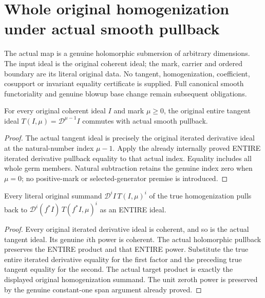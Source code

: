 \section{Whole original homogenization under actual smooth pullback}

The actual map is a genuine holomorphic submersion of arbitrary dimensions.
The input ideal is the original coherent ideal; the mark, carrier and ordered
boundary are its literal original data. No tangent, homogenization, coefficient,
cosupport or invariant equality certificate is supplied. Full canonical smooth
functoriality and genuine blowup base change remain subsequent obligations.

\begin{lemma}\label{hir:submersion-whole-tangent-ideal-equality}
For every original coherent ideal $I$ and mark $\mu\ge0$, the original entire
tangent ideal $T(I,\mu)=\mathcal D^{\mu-1}I$ commutes with actual smooth pullback.
\leanok
{}
\end{lemma}
\begin{proof}
The actual tangent ideal is precisely the original iterated derivative ideal
at the natural-number index $\mu-1$. Apply the already internally proved ENTIRE
iterated derivative pullback equality to that actual index. Equality includes
all whole germ members. Natural subtraction retains the genuine index zero
when $\mu=0$; no positive-mark or selected-generator premise is introduced.
\end{proof}

\begin{lemma}\label{hir:submersion-whole-homogenized-summands}
Every literal original summand $\mathcal D^iI\,T(I,\mu)^i$ of the true
homogenization pulls back to $\mathcal D^i(f^*I)\,T(f^*I,\mu)^i$ as an ENTIRE ideal.
\leanok
{}
\end{lemma}
\begin{proof}
Every original iterated derivative ideal is coherent, and so is the actual
tangent ideal. Its genuine $i$th power is coherent. The actual holomorphic
pullback preserves the ENTIRE product and that ENTIRE power. Substitute the
true entire iterated derivative equality for the first factor and the preceding
true tangent equality for the second. The actual target product is exactly the
displayed original homogenization summand. The unit zeroth power is preserved
by the genuine constant-one span argument already proved.
\end{proof}

